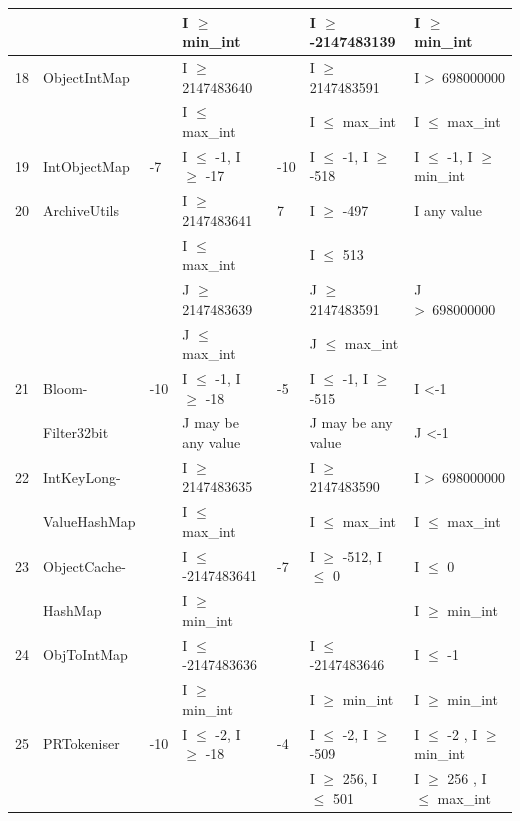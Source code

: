 {\begin{longtable}{|l|l|l|l|l|l|l|}
	&                                             && I $\ge$ min\_int				&& I $\ge$ -2147483139			& I $\ge$ min\_int 				\\	
	\hline
18	& ObjectIntMap				&& I $\ge$ 2147483640			&& I $\ge$ 2147483591			& I \textgreater~698000000					\\ 
	&                                             && I $\le$ max\_int				&& I $\le$ max\_int					& I $\le$ max\_int			\\	
	\hline
19	& IntObjectMap				&-7 & I $\le$ -1, I $\ge$ -17		&-10 & I $\le$ -1, I $\ge$ -518			& I $\le$ -1, I $\ge$ min\_int\\ 
	\hline
20	& ArchiveUtils				&& I $\ge$ 2147483641			& 7 & I $\ge$ -497					& I any value									\\ 
	&							&& I $\le$ max\_int				&& I $\le$ 513					& 											\\ 
	&                                             && J $\ge$ 2147483639			&& J $\ge$ 2147483591			& J \textgreater~698000000 	   				\\
	&                                             && J $\le$ max\_int				&& J $\le$ max\_int				&  	   										\\
	\hline
21	& Bloom- 					&-10 & I $\le$ -1, I $\ge$ -18	& -5 & I $\le$ -1, I $\ge$ -515			& I \textless -1 								\\ 
	& Filter32bit                            && J may be any value				&& J may be any value				& J \textless -1 			   					\\	
	\hline
22	& IntKeyLong-				&& I $\ge$ 2147483635			&& I $\ge$ 2147483590			& I \textgreater~698000000					\\ 
	& ValueHashMap                     && I $\le$ max\_int				&& I $\le$ max\_int					& I $\le$ max\_int			\\	
	\hline
23	& ObjectCache-				&& I $\le$ -2147483641			& -7 & I $\ge$ -512, I $\le$ 0			& I $\le$ 0								\\ 
	& HashMap                              && I $\ge$ min\_int				&& 								& I $\ge$ min\_int				\\	
	\hline
24	& ObjToIntMap				&& I $\le$ -2147483636			&& I $\le$ -2147483646			& I $\le$ -1								\\ 
	&                                             && I $\ge$ min\_int				&& I $\ge$ min\_int				& I $\ge$ min\_int			   	\\	
	\hline
25	& PRTokeniser				&-10& I $\le$ -2, I $\ge$ -18		&-4 & I $\le$ -2, I $\ge$ -509			& I $\le$ -2 , I $\ge$ min\_int\\ 
	&                                             && 								& & I $\ge$ 256, I $\le$ 501		& I $\ge$ 256 , I $\le$ max\_int\\


\end{longtable}}
